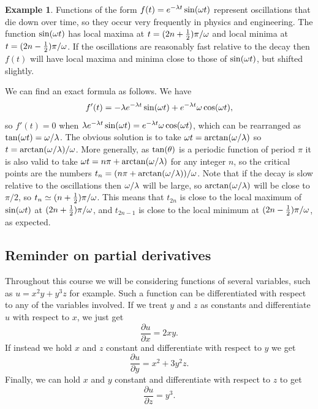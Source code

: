 \documentclass[reqno]{amsart}
\theoremstyle{definition}
\newtheorem{example}[theorem]{Example}
\begin{document}
\begin{example}
 Functions of the form $f(t)=e^{-\lambda t}\sin(\omega t)$ represent
 oscillations that die down over time, so they occur very frequently
 in physics and engineering.  The function $\sin(\omega t)$ has local
 maxima at $t=(2n+\tfrac{1}{2})\pi/\omega$ and local minima at
 $t=(2n-\tfrac{1}{2})\pi/\omega$.  If the oscillations are reasonably fast
 relative to the decay then $f(t)$ will have local maxima and minima
 close to those of $\sin(\omega t)$, but shifted slightly.  
 \begin{center}
 \end{center} 
 We can find an exact formula as follows.  We have
 \[ f'(t) = -\lambda e^{-\lambda t}\sin(\omega t) + e^{-\lambda t} \omega\cos(\omega t),
 \]
 so $f'(t)=0$ when
 $\lambda e^{-\lambda t}\sin(\omega t)=e^{-\lambda t}\omega\cos(\omega t)$, which can be
 rearranged as $\tan(\omega t)=\omega/\lambda$.  The obvious solution is to
 take $\omega t=\arctan(\omega/\lambda)$ so $t=\arctan(\omega/\lambda)/\omega$.  More
 generally, as $\tan(\theta)$ is a periodic function of period $\pi$ it
 is also valid to take $\omega t=n\pi+\arctan(\omega/\lambda)$ for any integer
 $n$, so the critical points are the numbers
 $t_n=(n\pi+\arctan(\omega/\lambda))/\omega$.  Note that if the decay is slow
 relative to the oscillations then $\omega/\lambda$ will be large, so
 $\arctan(\omega/\lambda)$ will be close to $\pi/2$, so
 $t_n\simeq(n+\tfrac{1}{2})\pi/\omega$.  This means that $t_{2n}$ is close to
 the local maximum of $\sin(\omega t)$ at $(2n+\tfrac{1}{2})\pi/\omega$, and
 $t_{2n-1}$ is close to the local minimum at $(2n-\tfrac{1}{2})\pi/\omega$, as
 expected.  
\end{example}

\subsection{Reminder on partial derivatives}
\label{subsec-partial}

Throughout this course we will be considering functions of several
variables, such as $u=x^2y+y^3z$ for example.  Such a function
can be differentiated with respect to any of the variables involved.
If we treat $y$ and $z$ as constants and differentiate $u$ with
respect to $x$, we just get 
\[ \frac{\partial u}{\partial x} = 2xy. \]
If instead we hold $x$ and $z$ constant and differentiate with respect
to $y$ we get 
\[ \frac{\partial u}{\partial y} = x^2+3y^2z. \]
Finally, we can hold $x$ and $y$ constant and differentiate with
respect to $z$ to get
\[ \frac{\partial u}{\partial z} = y^3. \]
\end{document}
